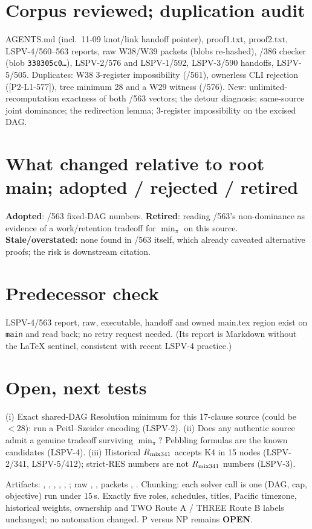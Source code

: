 \documentclass[10pt]{article}
\begin{document}
\section*{Corpus reviewed; duplication audit}
AGENTS.md (incl.\ 11-09 knot/link handoff pointer), proof1.txt, proof2.txt, LSPV-4/560--563 reports, raw W38/W39 packets (blobs re-hashed), /386 checker
(blob \texttt{338305c0\ldots}), LSPV-2/576 and LSPV-1/592, LSPV-3/590 handoffs, LSPV-5/505.  Duplicates: W38 3-register impossibility (/561), ownerless CLI
rejection ([P2-L1-577]), tree minimum 28 and a W29 witness (/576).  New: unlimited-recomputation exactness of both /563 vectors; the detour diagnosis;
same-source joint dominance; the redirection lemma; 3-register impossibility on the excised DAG.

\section*{What changed relative to root main; adopted / rejected / retired}
\textbf{Adopted}: /563 fixed-DAG numbers.  \textbf{Retired}: reading /563's non-dominance as evidence of a work/retention tradeoff for
\(\min_\pi\) on this source.  \textbf{Stale/overstated}: none found in /563 itself, which already caveated alternative proofs; the risk is downstream citation.

\section*{Predecessor check}
LSPV-4/563 report, raw, executable, handoff and owned main.tex region exist on \texttt{main} and read back; no retry request needed.
(Its report is Markdown without the LaTeX sentinel, consistent with recent LSPV-4 practice.)

\section*{Open, next tests}
(i) Exact shared-DAG Resolution minimum for this 17-clause source (could be \(<28\)): run a Peitl--Szeider encoding (LSPV-2).
(ii) Does any authentic source admit a genuine tradeoff surviving \(\min_\pi\)? Pebbling formulas are the known candidates (LSPV-4).
(iii) Historical \(R_{\rm mix341}\) accepts K4 in 15 nodes (LSPV-2/341, LSPV-5/412); strict-RES numbers are not \(R_{\rm mix341}\) numbers (LSPV-3).
\par\smallskip
Artifacts: , , ,
, , ;
raw , ,
packets , .
Chunking: each solver call is one (DAG, cap, objective) run under 15\,s.
Exactly five roles, schedules, titles, Pacific timezone, historical weights, ownership and TWO Route A / THREE Route B labels unchanged; no automation changed.
P versus NP remains \textbf{OPEN}.
\end{document}
